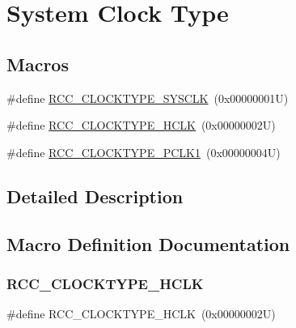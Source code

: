 \hypertarget{group___r_c_c___system___clock___type}{}\section{System Clock Type}
\label{group___r_c_c___system___clock___type}
\subsection*{Macros}
\begin{DoxyCompactItemize}
\item 
\#define \hyperlink{group___r_c_c___system___clock___type_ga7e721f5bf3fe925f78dae0356165332e}{R\+C\+C\+\_\+\+C\+L\+O\+C\+K\+T\+Y\+P\+E\+\_\+\+S\+Y\+S\+C\+LK}~(0x00000001\+U)
\item 
\#define \hyperlink{group___r_c_c___system___clock___type_gaa5330efbd790632856a2b15851517ef9}{R\+C\+C\+\_\+\+C\+L\+O\+C\+K\+T\+Y\+P\+E\+\_\+\+H\+C\+LK}~(0x00000002\+U)
\item 
\#define \hyperlink{group___r_c_c___system___clock___type_gab00c7b70f0770a616be4b5df45a454c4}{R\+C\+C\+\_\+\+C\+L\+O\+C\+K\+T\+Y\+P\+E\+\_\+\+P\+C\+L\+K1}~(0x00000004\+U)
\end{DoxyCompactItemize}


\subsection{Detailed Description}


\subsection{Macro Definition Documentation}
\mbox{\label{group___r_c_c___system___clock___type_gaa5330efbd790632856a2b15851517ef9}} 
\subsubsection{\texorpdfstring{R\+C\+C\+\_\+\+C\+L\+O\+C\+K\+T\+Y\+P\+E\+\_\+\+H\+C\+LK}{RCC\_CLOCKTYPE\_HCLK}}
{\footnotesize\ttfamily \#define R\+C\+C\+\_\+\+C\+L\+O\+C\+K\+T\+Y\+P\+E\+\_\+\+H\+C\+LK~(0x00000002\+U)}

